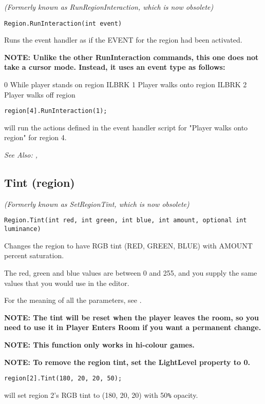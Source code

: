 \it{(Formerly known as RunRegionInteraction, which is now obsolete)}

\begin{verbatim}
Region.RunInteraction(int event)
\end{verbatim}
Runs the event handler as if the EVENT for the region had been activated.

\bf{NOTE:} Unlike the other RunInteraction commands, this one does not take a cursor mode.
Instead, it uses an event type as follows:

0  While player stands on region ILBRK
1  Player walks onto region ILBRK
2  Player walks off region

\begin{verbatim}
region[4].RunInteraction(1);
\end{verbatim}
will run the actions defined in the event handler script for "Player walks onto region"
for region 4.

\it{See Also:} ,


\subsection{Tint (region)}\label{Region.Tint}%

\it{(Formerly known as SetRegionTint, which is now obsolete)}

\begin{verbatim}
Region.Tint(int red, int green, int blue, int amount, optional int luminance)
\end{verbatim}
Changes the region to have RGB tint (RED, GREEN, BLUE) with AMOUNT percent
saturation.

The red, green and blue values are between 0 and 255, and you supply the same
values that you would use in the editor.

For the meaning of all the parameters, see .

\bf{NOTE}: The tint will be reset when the player leaves the room,
so you need to use it in Player Enters Room if you want a permanent
change.

\bf{NOTE:} This function only works in hi-colour games.

\bf{NOTE}: To remove the region tint, set the LightLevel property to 0.

\begin{verbatim}
region[2].Tint(180, 20, 20, 50);
\end{verbatim}
will set region 2's RGB tint to (180, 20, 20) with 50\verb$%$ opacity.

